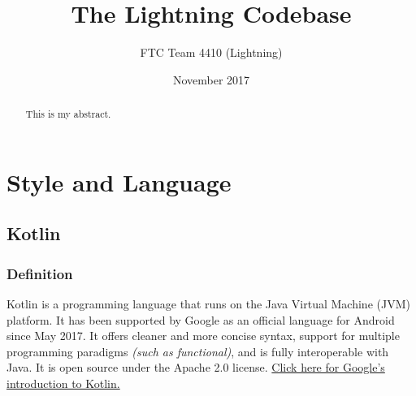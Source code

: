 \documentclass{article}
\begin{document}
\title{The Lightning Codebase}
\author{FTC Team 4410 (Lightning)}
\date{November 2017}
\maketitle

\begin{abstract}
This is my abstract.
\end{abstract}
\section{Style and Language}

\subsection{Kotlin}

\subsubsection{Definition}
Kotlin is a programming language that runs on the Java Virtual Machine (JVM) platform. It has been supported by Google as an official language for Android since May 2017. It offers cleaner and more concise syntax, support for multiple programming paradigms \textit{(such as functional)}, and is fully interoperable with Java. It is open source under the Apache 2.0 license. \href{https://developer.android.com/kotlin/index.html}{Click here for Google's introduction to Kotlin.}
\end{document}
